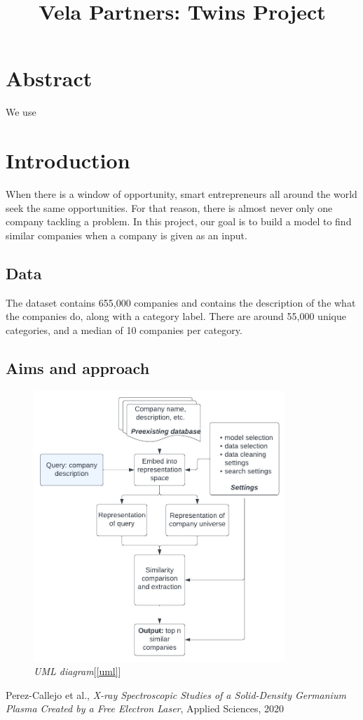 \documentclass[a4paper]{article}
\title{Vela Partners: Twins Project}
\begin{document}
\maketitle
\tableofcontents
\section{Abstract}
We use 
\section{Introduction}
When there is a window of opportunity, smart entrepreneurs all around the world
seek the same opportunities. For that reason, there is almost never only one
company tackling a problem. In this project, our goal is to build a model to
find similar companies when a company is given as an input.
\subsection{Data}
The dataset contains 655,000 companies and contains the description of the
what the companies do, along with a category label. There are around 55,000
unique categories, and a median of 10 companies per category.
\subsection{Aims and approach}

\begin{figure}[!h]
    \centerline{\includegraphics[width=95mm]{uml.jpeg}} \caption{{\it UML diagram}[\ref{uml}]}
    \label{setup}
\end{figure}

\clearpage
\begin{thebibliography}{9}
Perez-Callejo et al., \emph{X-ray Spectroscopic Studies of a Solid-Density
Germanium Plasma Created by a Free Electron Laser}, Applied Sciences,
2020\label{sampaper} 
\end{thebibliography}


\appendix
\renewcommand\thesection{Appendix \Alph{section}}
\end{document}
